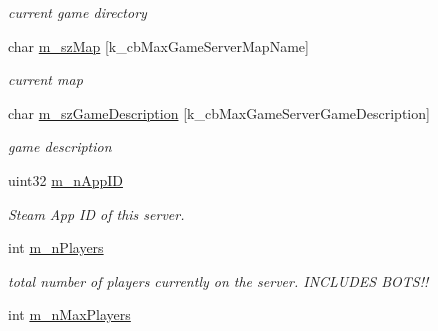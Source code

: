\begin{DoxyCompactItemize}
\begin{DoxyCompactList}\small\item\em current game directory \end{DoxyCompactList}\item 
\mbox{\label{classgameserveritem__t_af2308ac9d729d06bf0dde10e729ab417}} 
char \hyperlink{classgameserveritem__t_af2308ac9d729d06bf0dde10e729ab417}{m\+\_\+sz\+Map} \mbox{[}k\+\_\+cb\+Max\+Game\+Server\+Map\+Name\mbox{]}
\begin{DoxyCompactList}\small\item\em current map \end{DoxyCompactList}\item 
\mbox{\label{classgameserveritem__t_a0c7ee14b176d1cd0208187267febb85d}} 
char \hyperlink{classgameserveritem__t_a0c7ee14b176d1cd0208187267febb85d}{m\+\_\+sz\+Game\+Description} \mbox{[}k\+\_\+cb\+Max\+Game\+Server\+Game\+Description\mbox{]}
\begin{DoxyCompactList}\small\item\em game description \end{DoxyCompactList}\item 
\mbox{\label{classgameserveritem__t_a1570f474cde97c276735cff6dd9d3f79}} 
uint32 \hyperlink{classgameserveritem__t_a1570f474cde97c276735cff6dd9d3f79}{m\+\_\+n\+App\+ID}
\begin{DoxyCompactList}\small\item\em Steam App ID of this server. \end{DoxyCompactList}\item 
\mbox{\label{classgameserveritem__t_adb038abec9ad94d1631326e4d7bc7f09}} 
int \hyperlink{classgameserveritem__t_adb038abec9ad94d1631326e4d7bc7f09}{m\+\_\+n\+Players}
\begin{DoxyCompactList}\small\item\em total number of players currently on the server. I\+N\+C\+L\+U\+D\+ES B\+O\+T\+S!! \end{DoxyCompactList}\item 
\mbox{\label{classgameserveritem__t_adb7b54e32669f205bacb7c766fa90ff3}} 
int \hyperlink{classgameserveritem__t_adb7b54e32669f205bacb7c766fa90ff3}{m\+\_\+n\+Max\+Players}

\end{DoxyCompactItemize}
